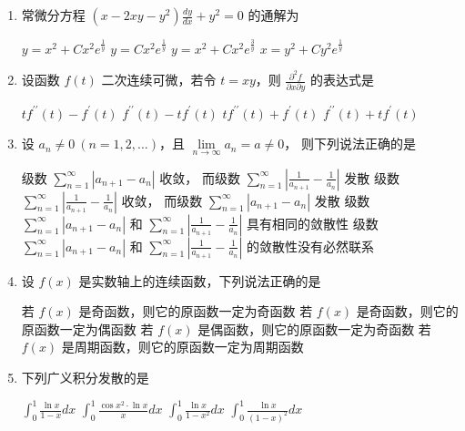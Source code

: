 \begin{enumerate}
\begin{enumerate}
\item
常微分方程 $\left(x-2 x y-y^2\right) \frac{d y}{d x}+y^2=0$ 的通解为 

\fourchoices
{$y=x^2+C x^2 e^{\frac{1}{y}}$}
{$y=C x^2 e^{\frac{1}{y}}$}
{$y=x^2+C x^2 e^{\frac{3}{y}}$}
{$x=y^2+C y^2 e^{\frac{1}{y}}$}


\item
设函数 $f(t)$ 二次连续可微，若令 $t=x y$，则 $\frac{\partial^2 f}{\partial x \partial y}$ 的表达式是 

\fourchoices
{$t f^{\prime \prime}(t)-f^{\prime}(t)$}
{$f^{\prime \prime}(t)-t f^{\prime}(t)$}
{$t f^{\prime \prime}(t)+f^{\prime}(t)$}
{$f^{\prime \prime}(t)+t f^{\prime}(t)$}


\item
设 $a_n \neq 0\ (n=1,2, \ldots)$，且 $\lim\limits_{n \rightarrow \infty} a_n=a \neq 0$，
则下列说法正确的是 

\fourchoices
{级数 $\sum\limits_{n=1}^{\infty}\left|a_{n+1}-a_n\right|$ 收敛，
而级数 $\sum\limits_{n=1}^{\infty}\left|\frac{1}{a_{n+1}}-\frac{1}{a_n}\right|$ 发散}
{级数 $\sum\limits_{n=1}^{\infty}\left|\frac{1}{a_{n+1}}-\frac{1}{a_n}\right|$ 收敛，
而级数 $\sum\limits_{n=1}^{\infty}\left|a_{n+1}-a_n\right|$ 发散}
{级数 $\sum\limits_{n=1}^{\infty}\left|a_{n+1}-a_n\right|$ 和
$\sum\limits_{n=1}^{\infty}\left|\frac{1}{a_{n+1}}-\frac{1}{a_n}\right|$ 具有相同的敛散性}
{级数 $\sum\limits_{n=1}^{\infty}\left|a_{n+1}-a_n\right|$ 和
$\sum\limits_{n=1}^{\infty}\left|\frac{1}{a_{n+1}}-\frac{1}{a_n}\right|$ 的敛散性没有必然联系}


\item
设 $f(x)$ 是实数轴上的连续函数，下列说法正确的是 

\fourchoices
{若 $f(x)$ 是奇函数，则它的原函数一定为奇函数}
{若 $f(x)$ 是奇函数，则它的原函数一定为偶函数}
{若 $f(x)$ 是偶函数，则它的原函数一定为奇函数}
{若 $f(x)$ 是周期函数，则它的原函数一定为周期函数}


\item
下列广义积分发散的是 

\fourchoices
{$\int_0^1 \frac{\ln x}{1-x} d x$}
{$\int_0^1 \frac{\cos x^2 \cdot \ln x}{x} d x$}
{$\int_0^1 \frac{\ln x}{1-x^2} d x$}
{$\int_0^1 \frac{\ln x}{(1-x)^2} d x$}


\end{enumerate}



\end{enumerate}
